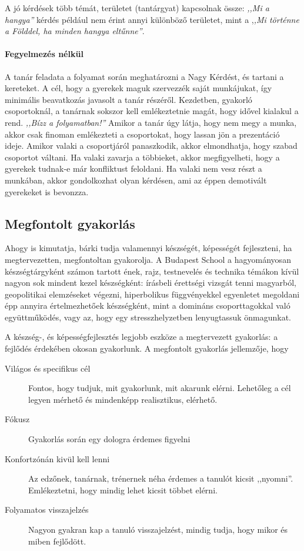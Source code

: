 A jó kérdések több témát, területet (tantárgyat) kapcsolnak össze: \emph{,,Mi a
hangya''} kérdés például nem érint annyi különböző területet, mint a ,\emph{,Mi
történne a Földdel, ha minden hangya eltűnne''}.

\paragraph{Fegyelmezés nélkül}
A tanár feladata a folyamat során meghatározni a Nagy Kérdést, és tartani a
kereteket. A cél, hogy a gyerekek maguk szervezzék saját munkájukat, így
minimális beavatkozás javasolt a tanár részéről. Kezdetben, gyakorló csoportoknál, a tanárnak
sokszor kell emlékeztetnie magát, hogy idővel kialakul a rend. \emph{,,Bízz a
folyamatban!''
}
Amikor a tanár úgy látja, hogy nem megy a munka, akkor csak finoman emlékezteti
a csoportokat, hogy lassan jön a prezentáció ideje. Amikor valaki a
csoportjáról panaszkodik, akkor elmondhatja, hogy szabad csoportot váltani. Ha
valaki zavarja a többieket, akkor megfigyelheti, hogy a gyerekek tudnak-e már
konfliktust feloldani. Ha valaki nem vesz részt a munkában, akkor gondolkozhat
olyan kérdésen, ami az éppen demotivált gyerekeket is bevonzza.

\subsection{Megfontolt gyakorlás}
Ahogy \citep{ericsson2016peak} is kimutatja, bárki tudja valamennyi készségét,
képességét fejleszteni, ha megtervezetten, megfontoltan gyakorolja. A Budapest
School a hagyományosan készségtárgyként számon tartott ének, rajz, testnevelés
és technika témákon kívül nagyon sok mindent kezel készségként: írásbeli
érettségi vizsgát tenni magyarból, geopolitikai elemzéseket végezni,
hiperbolikus függvényekkel egyenletet megoldani épp annyira értelmezhetőek
készségként, mint a domináns csoporttagokkal való együttműködés, vagy az, hogy
egy stresszhelyzetben lenyugtassuk önmagunkat.

A készség-, és képességfejlesztés legjobb eszköze a megtervezett gyakorlás:
a fejlődés érdekében okosan gyakorlunk. A megfontolt gyakorlás jellemzője, hogy

\begin{description}
      \item[Világos és specifikus cél] Fontos, hogy tudjuk, mit gyakorlunk, mit
            akarunk elérni.  Lehetőleg a cél legyen mérhető és mindenképp
            realisztikus,
            elérhető.
      \item[Fókusz] Gyakorlás során egy dologra érdemes figyelni
      \item[Konfortzónán kivül kell lenni] Az edzőnek, tanárnak, trénernek
            néha
            érdemes a tanulót kicsit ,,nyomni''. Emlékeztetni, hogy mindig
            lehet
            kicsit
            többet elérni.
      \item[Folyamatos visszajelzés] Nagyon gyakran kap a tanuló visszajelzést,
            mindig tudja, hogy mikor és miben fejlődött.
\end{description}

